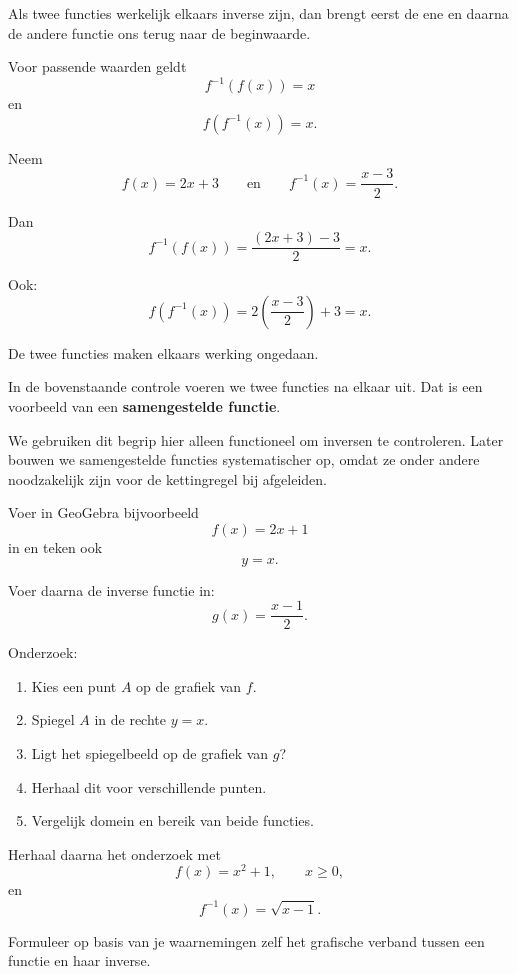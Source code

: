\documentclass{ximera}
\begin{document}

Als twee functies werkelijk elkaars inverse zijn, dan brengt eerst de ene
en daarna de andere functie ons terug naar de beginwaarde.

\begin{eigenschap}
Voor passende waarden geldt
\[
\boxed{f^{-1}(f(x))=x}
\]
en
\[
\boxed{f(f^{-1}(x))=x.}
\]
\end{eigenschap}

\begin{voorbeeld}
Neem
\[
f(x)=2x+3
\qquad\text{en}\qquad
f^{-1}(x)=\frac{x-3}{2}.
\]

Dan
\[
f^{-1}(f(x))
=
\frac{(2x+3)-3}{2}
=
x.
\]

Ook:
\[
f(f^{-1}(x))
=
2\left(\frac{x-3}{2}\right)+3
=
x.
\]

De twee functies maken elkaars werking ongedaan.
\end{voorbeeld}

\begin{opmerking}
In de bovenstaande controle voeren we twee functies na elkaar uit.
Dat is een voorbeeld van een \textbf{samengestelde functie}.

We gebruiken dit begrip hier alleen functioneel om inversen te controleren.
Later bouwen we samengestelde functies systematischer op, omdat ze onder
andere noodzakelijk zijn voor de kettingregel bij afgeleiden.
\end{opmerking}



\begin{opmerking}[GeoGebra-onderzoek: spiegeling in \(y=x\)]
Voer in GeoGebra bijvoorbeeld
\[
f(x)=2x+1
\]
in en teken ook
\[
y=x.
\]

Voer daarna de inverse functie in:
\[
g(x)=\frac{x-1}{2}.
\]

Onderzoek:

\begin{enumerate}
    \item Kies een punt \(A\) op de grafiek van \(f\).
    \item Spiegel \(A\) in de rechte \(y=x\).
    \item Ligt het spiegelbeeld op de grafiek van \(g\)?
    \item Herhaal dit voor verschillende punten.
    \item Vergelijk domein en bereik van beide functies.
\end{enumerate}

Herhaal daarna het onderzoek met
\[
f(x)=x^2+1,\qquad x\geq0,
\]
en
\[
f^{-1}(x)=\sqrt{x-1}.
\]

Formuleer op basis van je waarnemingen zelf het grafische verband tussen
een functie en haar inverse.
\end{opmerking}
\end{document}
